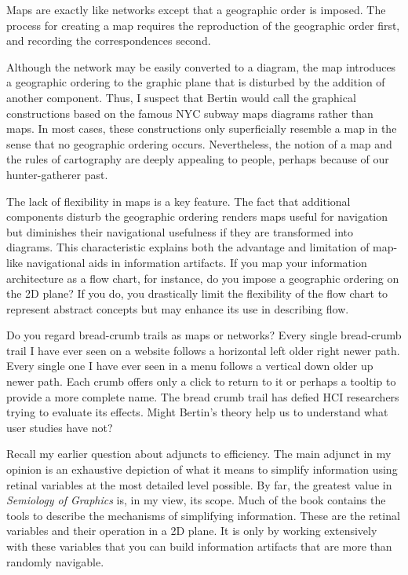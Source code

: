 \hypertarget{maps}{%
\label{maps}}

Maps are exactly like networks except that a geographic order is
imposed. The process for creating a map requires the reproduction of the
geographic order first, and recording the correspondences second.

Although the network may be easily converted to a diagram, the map
introduces a geographic ordering to the graphic plane that is disturbed
by the addition of another component. Thus, I suspect that Bertin would
call the graphical constructions based on the famous NYC subway maps
diagrams rather than maps. In most cases, these constructions only
superficially resemble a map in the sense that no geographic ordering
occurs. Nevertheless, the notion of a map and the rules of cartography
are deeply appealing to people, perhaps because of our hunter-gatherer
past.

The lack of flexibility in maps is a key feature. The fact that
additional components disturb the geographic ordering renders maps
useful for navigation but diminishes their navigational usefulness if
they are transformed into diagrams. This characteristic explains both
the advantage and limitation of map-like navigational aids in
information artifacts. If you map your information architecture as a
flow chart, for instance, do you impose a geographic ordering on the 2D
plane? If you do, you drastically limit the flexibility of the flow
chart to represent abstract concepts but may enhance its use in
describing flow.

Do you regard bread-crumb trails as maps or networks? Every single
bread-crumb trail I have ever seen on a website follows a horizontal
left older right newer path. Every single one I have ever seen in a menu
follows a vertical down older up newer path. Each crumb offers only a
click to return to it or perhaps a tooltip to provide a more complete
name. The bread crumb trail has defied HCI researchers trying to
evaluate its effects. Might Bertin's theory help us to understand what
user studies have not?

\hypertarget{simplification}{%
\label{simplification}}

Recall my earlier question about adjuncts to efficiency. The main
adjunct in my opinion is an exhaustive depiction of what it means to
simplify information using retinal variables at the most detailed level
possible. By far, the greatest value in \emph{Semiology of Graphics} is,
in my view, its scope. Much of the book contains the tools to describe
the mechanisms of simplifying information. These are the retinal
variables and their operation in a 2D plane. It is only by working
extensively with these variables that you can build information
artifacts that are more than randomly navigable.

